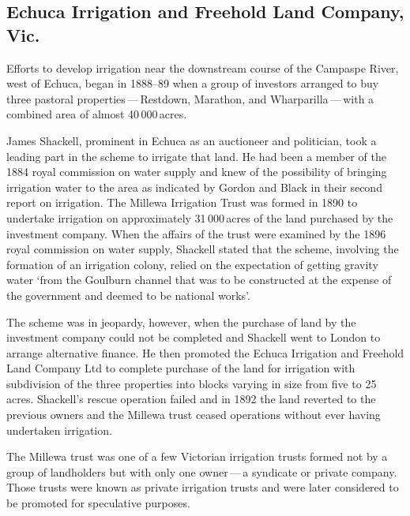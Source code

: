 \subsection*{Echuca Irrigation and Freehold Land Company, Vic.}

Efforts to develop irrigation near the downstream course of the
Campaspe River, west of Echuca, began in 1888--89 when a group of
investors arranged to buy three pastoral properties\,---\,Restdown,
Mara\-thon, and Wharparilla\,---\,with a combined area of almost
40\,000\,acres.

James Shackell,  prominent in Echuca as an
auctioneer and politician, took a leading part in the scheme to
irrigate that land.  He had been a member of the 1884 royal commission
on water supply and knew of the possibility of bringing irrigation
water to the area as indicated by Gordon and Black in their second
report on irrigation.  The Millewa Irrigation Trust
 was formed in 1890 to undertake
irrigation on approximately 31\,000\,acres of the land purchased by
the investment company.  When the affairs of the trust were examined
by the 1896 royal commission on water supply, Shackell stated that the
scheme, involving the formation of an irrigation colony, relied on the
expectation of getting gravity water `from the Goulburn channel that
was to be constructed at the expense of the government and deemed to
be national works'.

The scheme was in jeopardy, however, when the purchase of land by the
investment company could not be completed and Shackell went to London
to arrange alternative finance.  He then promoted the Echuca
Irrigation and Freehold Land Company Ltd to complete purchase of the
land for irrigation with subdivision of the three properties into
blocks varying in size from five to 25\,acres.  Shackell's rescue
operation failed and in 1892 the land reverted to the previous owners
and the Millewa trust ceased operations without ever having undertaken
irrigation.

The Millewa trust was one of a few Victorian irrigation trusts formed
not by a group of landholders but with only one owner\,---\,a syndicate
or private company.  Those trusts were known as private irrigation
trusts and were later considered to be promoted for speculative
purposes.

